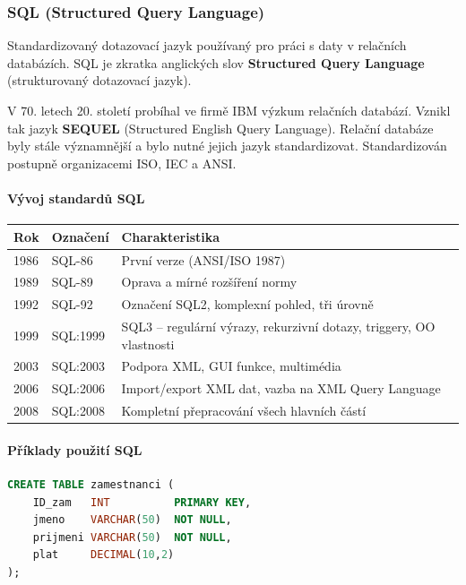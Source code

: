 \documentclass[12pt,a4paper]{article}
\begin{document}
\subsubsection{SQL (Structured Query Language)}

Standardizovaný dotazovací jazyk používaný pro práci s daty v relačních databázích. SQL je zkratka
anglických slov \textbf{Structured Query Language} (strukturovaný dotazovací jazyk).

V 70. letech 20. století probíhal ve firmě IBM výzkum relačních databází. Vznikl tak jazyk
\textbf{SEQUEL} (Structured English Query Language). Relační databáze byly stále významnější a bylo
nutné jejich jazyk standardizovat. Standardizován postupně organizacemi ISO, IEC a ANSI.

\paragraph{Vývoj standardů SQL}
\begin{center}
\begin{tabular}{lll}
\toprule
\textbf{Rok} & \textbf{Označení} & \textbf{Charakteristika} \\
\midrule
1986 & SQL-86   & První verze (ANSI/ISO 1987) \\
1989 & SQL-89   & Oprava a mírné rozšíření normy \\
1992 & SQL-92   & Označení SQL2, komplexní pohled, tři úrovně \\
1999 & SQL:1999 & SQL3 -- regulární výrazy, rekurzivní dotazy, triggery, OO vlastnosti \\
2003 & SQL:2003 & Podpora XML, GUI funkce, multimédia \\
2006 & SQL:2006 & Import/export XML dat, vazba na XML Query Language \\
2008 & SQL:2008 & Kompletní přepracování všech hlavních částí \\
\bottomrule
\end{tabular}
\end{center}

\paragraph{Příklady použití SQL}

\begin{lstlisting}[language=SQL, caption=Vytvoření tabulky]
CREATE TABLE zamestnanci (
    ID_zam   INT          PRIMARY KEY,
    jmeno    VARCHAR(50)  NOT NULL,
    prijmeni VARCHAR(50)  NOT NULL,
    plat     DECIMAL(10,2)
);
\end{lstlisting}
\end{document}
